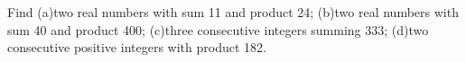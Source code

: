 Find (a)two real numbers with sum 11 and product 24; (b)two real numbers with sum 40 and product 400; (c)three consecutive integers summing 333; (d)two consecutive positive integers with product 182.

